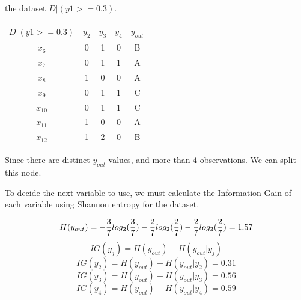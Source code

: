 \documentclass{article}
\begin{document}
\begin{enumerate}[leftmargin=\labelsep]
\begin{minipage}{0.6\textwidth}
  the dataset $D | (y1 >= 0.3)$.
  \begin{table}[H]
    \centering
    \begin{tabular}{@{}ccccc}
      $D | (y1 >= 0.3)$ & $y_2$ & $y_3$ & $y_4$ & $y_{out}$ \\ \midrule
      $x_6$  & 0 & 1 & 0 & B \\
      $x_7$  & 0 & 1 & 1 & A \\
      $x_8$  & 1 & 0 & 0 & A \\
      $x_9$  & 0 & 1 & 1 & C \\
      $x_{10}$ & 0 & 1 & 1 & C \\
      $x_{11}$ & 1 & 0 & 0 & A \\
      $x_{12}$ & 1 & 2 & 0 & B \\
    \end{tabular}
  \end{table}

  Since there are distinct $y_{out}$ values, and more 
  than 4 observations. We can split this node.
\end{minipage}
 
\hspace{3pt}

To decide the next variable to use, we must calculate 
the Information Gain of each variable using Shannon 
entropy for the dataset.

\begin{equation*}
    H(y_{out}) = -\frac{3}{7}log_2(\frac{3}{7})-\frac{2}{7}log_2(\frac{2}{7})-\frac{2}{7}log_2(\frac{2}{7}) \\ [2ex]
    = 1.57
\end{equation*}
\begin{equation*}
  IG(y_j) = H(y_{out}) - H(y_{out}|y_j)
\end{equation*}
\begin{equation*}
  IG(y_2) = H(y_{out}) - H(y_{out}|y_2) = 0.31
\end{equation*}
\begin{equation*}
  IG(y_3) = H(y_{out}) - H(y_{out}|y_3) = 0.56
\end{equation*}
\begin{equation*}
  IG(y_4) = H(y_{out}) - H(y_{out}|y_4) = 0.59
\end{equation*}


\end{enumerate}
\end{document}
